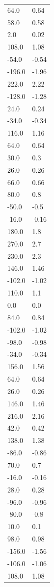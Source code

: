 \begin{longtable}{ll}
64.0 & 0.64 \\
58.0 & 0.58 \\
2.0 & 0.02 \\
108.0 & 1.08 \\
-54.0 & -0.54 \\
-196.0 & -1.96 \\
222.0 & 2.22 \\
-128.0 & -1.28 \\
24.0 & 0.24 \\
-34.0 & -0.34 \\
116.0 & 1.16 \\
64.0 & 0.64 \\
30.0 & 0.3 \\
26.0 & 0.26 \\
66.0 & 0.66 \\
80.0 & 0.8 \\
-50.0 & -0.5 \\
-16.0 & -0.16 \\
180.0 & 1.8 \\
270.0 & 2.7 \\
230.0 & 2.3 \\
146.0 & 1.46 \\
-102.0 & -1.02 \\
110.0 & 1.1 \\
0.0 & 0.0 \\
84.0 & 0.84 \\
-102.0 & -1.02 \\
-98.0 & -0.98 \\
-34.0 & -0.34 \\
156.0 & 1.56 \\
64.0 & 0.64 \\
26.0 & 0.26 \\
146.0 & 1.46 \\
216.0 & 2.16 \\
42.0 & 0.42 \\
138.0 & 1.38 \\
-86.0 & -0.86 \\
70.0 & 0.7 \\
-16.0 & -0.16 \\
28.0 & 0.28 \\
-96.0 & -0.96 \\
-80.0 & -0.8 \\
10.0 & 0.1 \\
98.0 & 0.98 \\
-156.0 & -1.56 \\
-106.0 & -1.06 \\
108.0 & 1.08 \\

\end{longtable}
